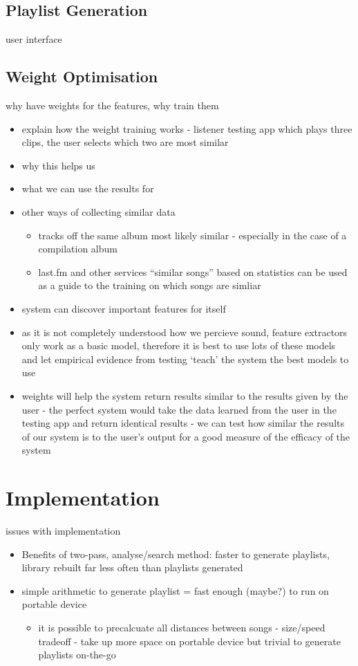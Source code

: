 \subsection{Playlist Generation}
user interface
\subsection{Weight Optimisation}
why have weights for the features, why train them
\begin{itemize}
	\item explain how the weight training works - listener testing app which plays three clips, the user selects which two are most similar
	\item why this helps us
	\item what we can use the results for
	\item other ways of collecting similar data
	\begin{itemize}
		\item tracks off the same album most likely similar - especially in the case of a compilation album
		\item last.fm and other services ``similar songs'' based on statistics can be used as a guide to the training on which songs are simliar
	\end{itemize}
\end{itemize}
\begin{itemize}
	\item system can discover important features for itself
	\item as it is not completely understood how we percieve sound, feature extractors only work as a basic model, therefore it is best to use lots of these models and let empirical evidence from testing `teach' the system the best models to use
	\item weights will help the system return results similar to the results given by the user - the perfect system would take the data learned from the user in the testing app and return identical results - we can test how similar the results of our system is to the user's output for a good measure of the efficacy of the system
\end{itemize}
\section{Implementation}
issues with implementation
\begin{itemize}
	\item Benefits of two-pass, analyse/search method: faster to generate playlists, library rebuilt far less often than playlists generated
	\item simple arithmetic to generate playlist = fast enough (maybe?) to run on portable device
	\begin{itemize}
		\item it is possible to precalcuate all distances between songs - size/speed tradeoff - take up more space on portable device but trivial to generate playlists on-the-go
	\end{itemize}
\end{itemize}
